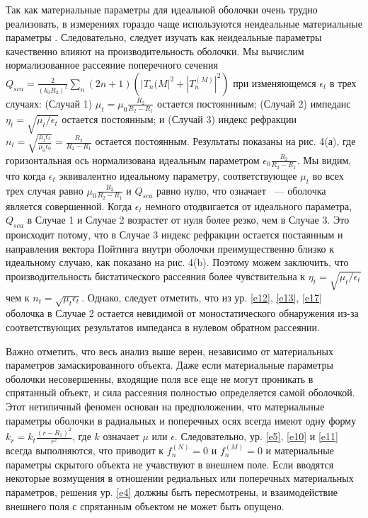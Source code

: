 \documentclass[a4paper, 12pt]{article}
\begin{document}
Так как материальные параметры для идеальной оболочки очень трудно реализовать,
в измерениях гораздо чаще используются неидеальные материальные параметры 
\cite{1,2}. Следовательно, следует изучать как неидеальные параметры качественно
влияют на производительность оболочки. Мы вычислим нормализованное рассеяние
поперечного сечения 
$Q_{sca}=\frac{2}{(k_0R_2)^2}\sum_n(2n+1)(|T_n{(M}|^2+|T_n^{(M)}|^2)$ при 
изменяющемся $\epsilon_t$ в трех случаях: (Случай 1) 
$\mu_t=\mu_0 \frac{R_2}{R_2-R_1}$ остается постояннным; (Случай 2) импеданс
$\eta_t=\sqrt{\mu_t/\epsilon_t}$ остается постоянным; и (Случай 3)
индекс рефракции 
$n_t=\sqrt{\frac{\mu_t\epsilon_t}{\mu_0\epsilon_0}}=\frac{R_2}{R_2-R_1}$
остается постоянным. Результаты показаны на рис. 4(а), где горизонтальная
ось нормализована идеальным параметром $\epsilon_0 \frac{R_2}{R_2-R_1}$.
Мы видим, что когда $\epsilon_t$ эквивалентно идеальному параметру,
соответствующее $\mu_t$ во всех трех случая равно $\mu_0 \frac{R_2}{R_2-R_1}$ и
$Q_{sca}$ равно нулю, что означает ~--- оболочка является совершенной.
Когда $\epsilon_t$ немного отодвигается от идеального параметра, $Q_{sca}$
в Случае 1 и Случае 2 возрастет от нуля более резко, чем в Случае 3.
Это происходит потому, что в Случае 3 индекс рефракции остается 
постаянным и направления вектора Пойтинга внутри оболочки преимущественно
близко к идеальному случаю, как показано на рис. 4(b). Поэтому можем 
заключить, что производительность бистатического рассеяния более чувствительна
к $\eta_t=\sqrt{\mu_t/\epsilon_t}$ чем к $n_t=\sqrt{\mu_t\epsilon_t}$.
Однако, следует отметить, что из ур. 
\eqref{e12}, \eqref{e13}, \eqref{e17} оболочка в Случае 2
остается невидимой от моностатического обнаружения из-за соответствующих
результатов импеданса в нулевом обратном рассеянии.

Важно отметить, что весь анализ выше верен, независимо от материальных параметров
замаскированного объекта. Даже если материальные параметры оболочки несовершенны,
входящие поля все еще не могут проникать в спрятанный объект, и сила рассеяния
полностью определяется самой оболочкой. Этот нетипичный феномен основан на 
предположении, что материальные параметры оболочки в радиальных и поперечных
осях всегда имеют одну форму $k_r=k_t \frac{(r-R_1)^2}{r^2}$, где $k$ означает
$\mu$ или $\epsilon$. Следовательно, ур. \eqref{e5}, \eqref{e10} и \eqref{e11}
всегда выполняются, что приводит к $f_n^{(N)}=0$ и $f_n^{(M)}=0$ и материальные
параметры скрытого объекта не учавствуют в внешнем поле. Если вводятся некоторые
возмущения в отношении редиальных или поперечных материальных параметров,
решения ур. \eqref{e4} должны быть пересмотрены, и взаимодействие внешнего
поля с спрятанным объектом не может быть опущено.
\end{document}
